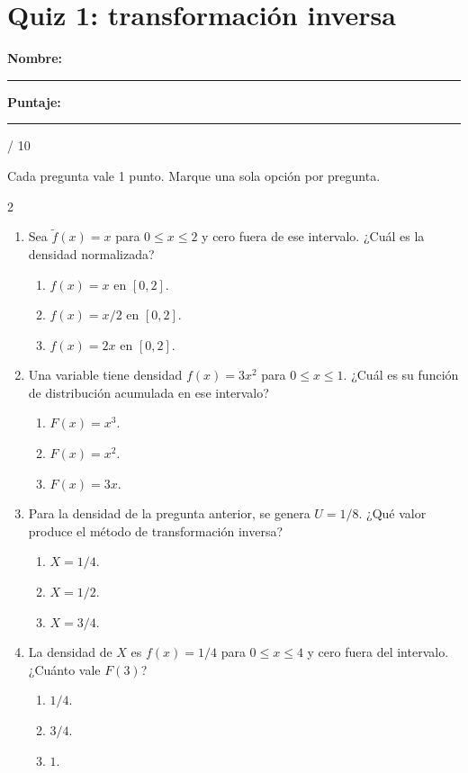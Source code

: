 \documentclass[11pt]{article}
\begin{document}
\section*{Quiz 1: transformación inversa}

\textbf{Nombre:} \rule{7cm}{0.4pt}\hfill
\textbf{Puntaje:} \rule{1.5cm}{0.4pt} / 10

Cada pregunta vale 1 punto. Marque una sola opción por pregunta.

\begingroup
\setlength{\parskip}{0pt}
\begin{multicols}{2}
\begin{enumerate}
    \item Sea $\widetilde f(x)=x$ para $0\leq x\leq2$ y cero fuera de ese
    intervalo. ¿Cuál es la densidad normalizada?
    \begin{enumerate}
        \item $f(x)=x$ en $[0,2]$.
        \item $f(x)=x/2$ en $[0,2]$.
        \item $f(x)=2x$ en $[0,2]$.
    \end{enumerate}

    \item Una variable tiene densidad $f(x)=3x^2$ para $0\leq x\leq1$.
    ¿Cuál es su función de distribución acumulada en ese intervalo?
    \begin{enumerate}
        \item $F(x)=x^3$.
        \item $F(x)=x^2$.
        \item $F(x)=3x$.
    \end{enumerate}

    \item Para la densidad de la pregunta anterior, se genera $U=1/8$.
    ¿Qué valor produce el método de transformación inversa?
    \begin{enumerate}
        \item $X=1/4$.
        \item $X=1/2$.
        \item $X=3/4$.
    \end{enumerate}

    \item La densidad de $X$ es $f(x)=1/4$ para $0\leq x\leq4$ y cero fuera
    del intervalo. ¿Cuánto vale $F(3)$?
    \begin{enumerate}
        \item $1/4$.
        \item $3/4$.
        \item $1$.
    \end{enumerate}


\end{enumerate}
\end{multicols}
\end{document}

